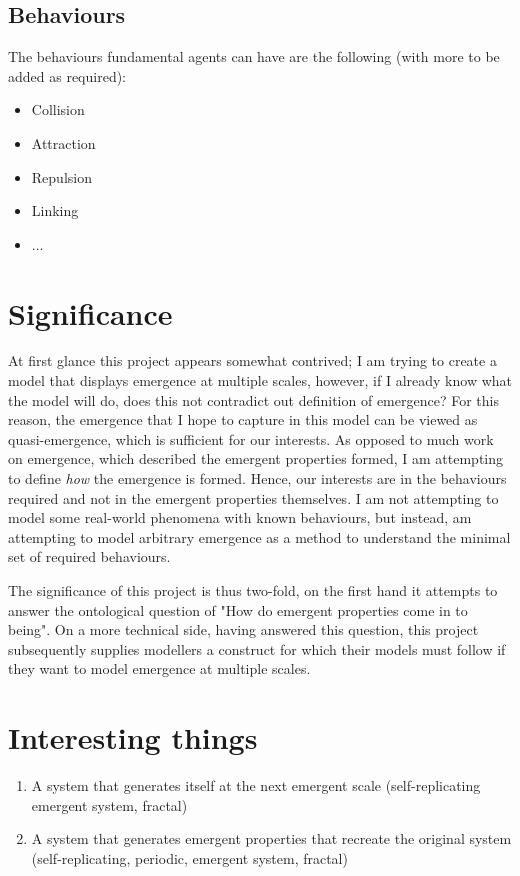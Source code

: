\documentclass{article}
\begin{document}
    \subsection{Behaviours}
      
      The behaviours fundamental agents can have are the following (with more to be added as required):

      \begin{itemize}
        \item Collision
        \item Attraction
        \item Repulsion
        \item Linking
        \item ...
      \end{itemize}


\section{Significance}

  At first glance this project appears somewhat contrived; I am trying to create a model that displays emergence at multiple scales, however, if I already know what the model will do, does this not contradict out definition of emergence? For this reason, the emergence that I hope to capture in this model can be viewed as quasi-emergence, which is sufficient for our interests. As opposed to much work on emergence, which described the emergent properties formed, I am attempting to define \textit{how} the emergence is formed. Hence, our interests are in the behaviours required and not in the emergent properties themselves. I am not attempting to model some real-world phenomena with known behaviours, but instead, am attempting to model arbitrary emergence as a method to understand the minimal set of required behaviours. 

  The significance of this project is thus two-fold, on the first hand it attempts to answer the ontological question of "How do emergent properties come in to being". On a more technical side, having answered this question, this project subsequently supplies modellers a construct for which their models must follow if they want to model emergence at multiple scales.


\section{Interesting things}

  \begin{enumerate}[label=\textbf{\alph*)}]
    \item A system that generates itself at the next emergent scale (self-replicating emergent system, fractal)
    \item A system that generates emergent properties that recreate the original system (self-replicating, periodic, emergent system, fractal)
  \end{enumerate}
\end{document}
